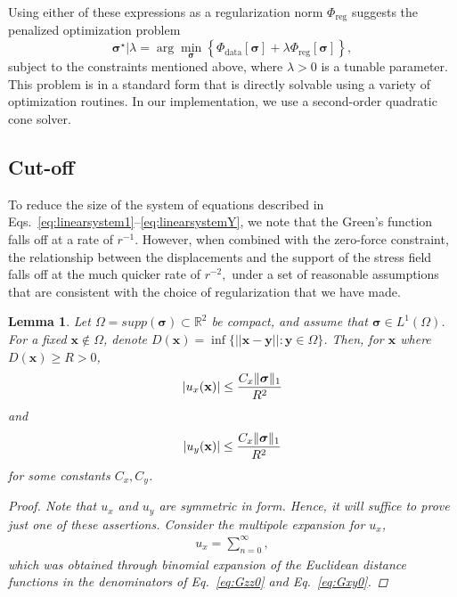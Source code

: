 \documentclass[aps,prl,reprint,twocolumn,groupedaddress,showpacs]{revtex4-1}
\newtheorem{lem}[thm]{Lemma}%
\DeclarePairedDelimiter{\norm}{\lVert}{\rVert}
\newcommand{\bsigma}{{\boldsymbol\sigma}}
\begin{document}
Using either of these expressions as a regularization norm $\Phi_{\textrm{reg}}$ suggests the penalized optimization problem
\begin{equation}
\bsigma^\star \big\vert \lambda = \arg\min_{\bsigma} \left\{ \Phi_{\textrm{data}}[\bsigma] + \lambda\Phi_{\textrm{reg}}[\bsigma] \right\},\label{eq:objective}
\end{equation}
subject to the constraints mentioned above,
where $\lambda>0$ is a tunable parameter. This problem
 is in a standard form that is directly solvable using a variety of optimization routines.
  In our implementation, we use a second-order  quadratic cone solver. 
\subsection{Cut-off}
To reduce the size of the system of equations described in Eqs.~\ref{eq:linearsystem1}--\ref{eq:linearsystemY}, we note that the Green's function falls off at a rate of $r^{-1}$. However,
when combined with the zero-force constraint, the relationship between the displacements
and the support of the stress field falls off at the much quicker rate of $r^{-2},$ under a
set of reasonable assumptions that are consistent with the choice of regularization that we have
made.

\begin{lem} 
      \label{lem:main}
Let $\Omega = supp(\bsigma)\subset \mathbb{R}^2$ be compact, and assume that $\bsigma\in L^1(\Omega)$. For a fixed $\mathbf{x}\not\in\Omega$, denote $D(\mathbf{x}) = \inf\{ || \mathbf{x} -\mathbf{y}|| : \mathbf{y}\in\Omega \}$. Then, for $\mathbf{x}$ where $D(\mathbf{x})\geq R>0$, 
\begin{equation}
\vert u_x(\mathbf{x}) \vert \leq \frac{C_x\norm{\bsigma}_1}{R^2}
\end{equation}      
and
\begin{equation}
\vert u_y(\mathbf{x}) \vert \leq \frac{C_x\norm{\bsigma}_1}{R^2}
\end{equation}      
for some constants $C_x,C_y$.

\begin{proof}
Note that $u_x$ and $u_y$ are symmetric in form. Hence, it will suffice to prove just one of these assertions. Consider the multipole expansion for $u_x$, 
\begin{align}
u_x = \sum_{n=0}^\infty ,
\end{align}
which was obtained through binomial expansion of the Euclidean distance functions in the denominators of Eq.~\ref{eq:Gzz0} and Eq.~\ref{eq:Gxy0}.
\end{proof}
      
\end{lem}
\end{document}
